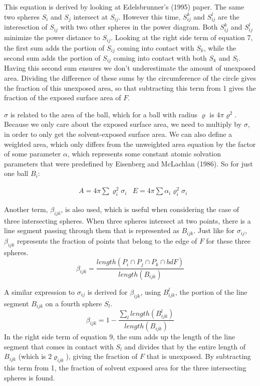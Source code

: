 \documentclass{article}
\begin{document}
This equation is derived by looking at Edelsbrunner's (1995) paper. The same two spheres $S_i$ and $S_j$ intersect at $S_{ij}$. However this time, $S^k_{ij}$ and $S^l_{ij}$ are the interesction of $S_{ij}$ with two other spheres in the power diagram. Both  $S^k_{ij}$ and $S^l_{ij}$ minimize the power distance to $S_{ij}$. Looking at the right side term of equation 7, the first sum adds the portion of $S_{ij}$ coming into contact with $S_k$, while the second sum adds the portion of $S_{ij}$ coming into contact with both $S_k$ and $S_l$. Having this second sum ensures we don't underestimate the amount of unexposed area. Dividing the difference of these sums by the circumference of the circle gives the fraction of this unexposed area, so that subtracting this term from 1 gives the fraction of the exposed surface area of $F$.

$\sigma$ is related to the area of the ball, which for a ball with radius $\varrho$ is $4\pi\varrho^2$. Because we only care about the exposed surface area, we need to multiply by $\sigma$, in order to only get the solvent-exposed surface area. We can also define a weighted area, which only differs from the unweighted area equation by the factor of some parameter $\alpha$, which represents some constant atomic solvation parameters that were predefined by Eisenberg and McLachlan (1986). So for just one ball $B_i$:

\begin{align*}
&A = 4\pi\sum \varrho_i^2\sigma_i
&E = 4\pi\sum\alpha_i\varrho_i^2\sigma_i
\end{align*}


Another term, $\beta_{ijk}$, is also used, which is useful when considering the case of three intersecting spheres. When three spheres intersect at two points, there is a line segment passing through them that is represented as $B_{ijk}$. Just like for $\sigma_{ij}$, $\beta_{ijk}$ represents the fraction of points that belong to the edge of $F$ for these three spheres.
\begin{equation}
\beta_{ijk} = \frac{length(P_i \cap P_j \cap P_k \cap bd F)}{length(B_{ijk})}
\end{equation}

A similar expression to $\sigma_{ij}$ is derived for $\beta_{ijk}$, using $B^l_{ijk}$, the portion of the line segment $B_{ijk}$ on a fourth sphere $S_l$. 
\begin{equation}
\beta_{ijk} = 1 - \frac{\sum_{l}length(B^l_{ijk})}{length(B_{ijk})}
\end{equation}
In the right side term of equation 9, the sum adds up the length of the line segment that comes in contact with $S_l$ and divides that by the entire length of $B_{ijk}$ (which is $2\varrho_{ijk}$), giving the fraction of $F$ that is unexposed. By subtracting this term from 1, the fraction of solvent exposed area for the three intersecting spheres is found.
\end{document}
